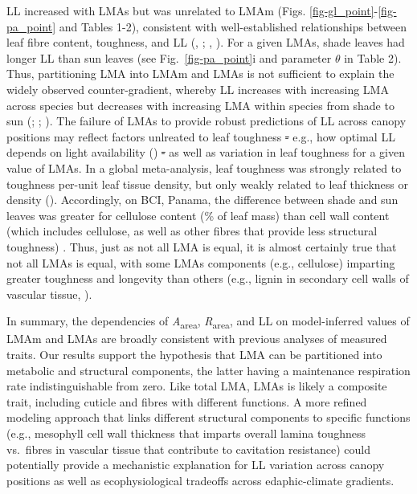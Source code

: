 \documentclass[
  12pt,
  letterpaper,
  DIV=11,
  numbers=noendperiod]{scrartcl}
\providecommand{\DIFadd}[1]{{\protect\color{blue}\uwave{#1}}} %
\providecommand{\DIFdel}[1]{{\protect\color{red}\sout{#1}}}                      %
\providecommand{\DIFaddbegin}{} %
\providecommand{\DIFaddend}{} %
\providecommand{\DIFdelbegin}{} %
\providecommand{\DIFdelend}{} %
\newcommand{\DIFscaledelfig}{0.5}
\newlength{\DIFdelgraphicswidth} %
\newlength{\DIFdelgraphicsheight} %
\newcommand{\DIFaddincludegraphics}[2][]{{\color{blue}\fbox{\DIFOincludegraphics[#1]{#2}}}} %
\newcommand{\DIFdelincludegraphics}[2][]{%
\sbox{\DIFdelgraphicsbox}{\DIFOincludegraphics[#1]{#2}}%
\settoboxwidth{\DIFdelgraphicswidth}{\DIFdelgraphicsbox} %
\settoboxtotalheight{\DIFdelgraphicsheight}{\DIFdelgraphicsbox} %
\scalebox{\DIFscaledelfig}{%
\parbox[b]{\DIFdelgraphicswidth}{\usebox{\DIFdelgraphicsbox}\\[-\baselineskip] \rule{\DIFdelgraphicswidth}{0em}}\llap{\resizebox{\DIFdelgraphicswidth}{\DIFdelgraphicsheight}{%
\setlength{\unitlength}{\DIFdelgraphicswidth}%
\begin{picture}(1,1)%
\thicklines\linethickness{2pt} %
{\color[rgb]{1,0,0}\put(0,0){\framebox(1,1){}}}%
{\color[rgb]{1,0,0}\put(0,0){\line( 1,1){1}}}%
{\color[rgb]{1,0,0}\put(0,1){\line(1,-1){1}}}%
\end{picture}%
}\hspace*{3pt}}} %
} %
\DeclareRobustCommand{\DIFaddbegin}{\DIFOaddbegin \let\includegraphics\DIFaddincludegraphics} %
\DeclareRobustCommand{\DIFaddend}{\DIFOaddend \let\includegraphics\DIFOincludegraphics} %
\DeclareRobustCommand{\DIFdelbegin}{\DIFOdelbegin \let\includegraphics\DIFdelincludegraphics} %
\DeclareRobustCommand{\DIFdelend}{\DIFOaddend \let\includegraphics\DIFOincludegraphics} %
\begin{document}
LL increased with LMAs but was unrelated to LMAm (Figs.
\ref{fig-gl_point}-\ref{fig-pa_point} and Tables 1-2), consistent with
well-established relationships between leaf fibre content, toughness,
and LL (,
; , ). For a given LMAs, shade
leaves had longer LL than sun leaves (see Fig.~\ref{fig-pa_point}i and
parameter \(\theta\) in Table 2). Thus, partitioning LMA into LMAm and
LMAs is not sufficient to explain the widely observed counter-gradient,
whereby LL increases with increasing LMA across species but decreases
with increasing LMA within species from shade to sun
(;
;
). The failure of LMAs
to provide robust predictions of LL across canopy positions may reflect
factors unlreated to leaf toughness \DIFdelbegin \DIFdel{- }\DIFdelend \DIFaddbegin \DIFadd{− }\DIFaddend e.g., how optimal LL depends on
light availability () \DIFdelbegin \DIFdel{- }\DIFdelend \DIFaddbegin \DIFadd{− }\DIFaddend as
well as variation in leaf toughness for a given value of LMAs. In a
global meta-analysis, leaf toughness was strongly related to toughness
per-unit leaf tissue density, but only weakly related to leaf thickness
or density (). Accordingly,
on BCI, Panama, the difference between shade and sun leaves was greater
for cellulose content (\% of leaf mass) than cell wall content (which
includes cellulose, as well as other fibres that provide less structural
toughness) \DIFaddbegin \DIFadd{(\mbox{%
\citeproc{ref-Kitajima2016}{Kitajima et al., 2016}}\hspace{0pt}%
)}\DIFaddend . Thus,
just as not all LMA is equal, it is almost certainly true that not all
LMAs is equal, with some LMAs components (e.g., cellulose) imparting
greater toughness and longevity than others (e.g., lignin in secondary
cell walls of vascular tissue, ).

In summary, the dependencies of \emph{A}\textsubscript{area},
\emph{R}\textsubscript{area}, and LL on model-inferred values of LMAm
and LMAs are broadly consistent with previous analyses of measured
traits. Our results support the hypothesis that LMA can be partitioned
into metabolic and structural components, the latter having a
maintenance respiration rate indistinguishable from zero. Like total
LMA, LMAs is likely a composite trait, including cuticle and fibres with
different functions. A more refined modeling approach that links
different structural components to specific functions (e.g., mesophyll
cell wall thickness that imparts overall lamina toughness vs.~fibres in
vascular tissue that contribute to cavitation resistance) could
potentially provide a mechanistic explanation for LL variation across
canopy positions as well as ecophysiological tradeoffs across
edaphic-climate gradients.
\end{document}
